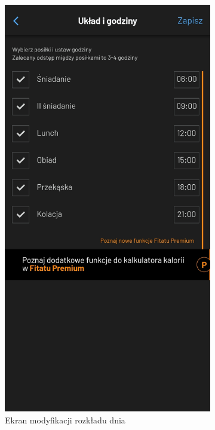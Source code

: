 \documentclass[12pt, a4paper]{article}
\begin{document}
\begin{sloppypar}
{{{\begin{itemize}
\begin{figure}[H]
\begin{subfigure}{.5\textwidth}
            \includegraphics[width=.8\linewidth]{fitatu_pro_2.jpg}
            \caption{Ekran modyfikacji rozkładu dnia}
            \label{fig:subfit1}
          \end{subfigure}%
          \begin{subfigure}{.5\textwidth}
            \centering

\end{subfigure}
\end{figure}
\end{itemize}}}}
\end{sloppypar}
\end{document}
